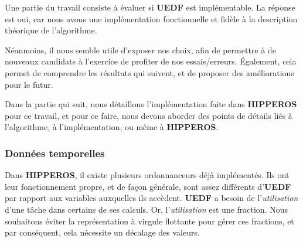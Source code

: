 
	Une partie du travail consiste à évaluer si \textbf{UEDF} est implémentable. 
	La réponse est oui, car nous avons une implémentation fonctionnelle et fidèle à la description 
	théorique de l'algorithme. \newline
	
	Néanmoins, il nous semble utile d'exposer nos choix, afin de permettre à de nouveaux candidats 
	à l'exercice de profiter de nos essais/erreurs. Également, cela permet de comprendre les 
	résultats qui suivent, et de proposer des améliorations pour le futur.\newline
	
	Dans la partie qui suit, nous détaillons l'implémentation faite dans \textbf{HIPPEROS} pour ce travail, 
	et pour ce faire, nous devons aborder des points de détails liés à l'algorithme, 
	à l'implémentation, ou même à \textbf{HIPPEROS}.

	\subsubsection{Données temporelles}
	
		Dans \textbf{HIPPEROS}, il existe plusieurs ordonnanceurs déjà implémentés. 
		Ils ont leur fonctionnement propre, et de façon générale, sont assez différents d'\textbf{UEDF} par 
		rapport aux variables auxquelles ils accèdent. 
		\textbf{UEDF} a besoin de l'\textit{utilisation} d'une tâche dans certains de ses calculs. Or, l'\textit{utilisation} 
		est une fraction. Nous souhaitons éviter la représentation à virgule flottante 
		pour gérer ces fractions, et par conséquent, cela nécessite un décalage des valeurs.\newline
		 
